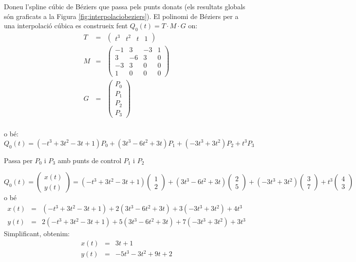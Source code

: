 \begin{llista}
\item Doneu l'spline cúbic de Béziers que passa pels punts donats (els resultats globals són graficats a la Figura \ref{fig:interpolaciobeziers}). El polinomi de Béziers per a una interpolació cúbica es construeix fent $Q_0(t)=T\cdot M \cdot G$ on:
\begin{eqnarray*}
  T&=& \begin{pmatrix}t^3 & t^2 & t & 1\end{pmatrix}\\
  M&=& \begin{pmatrix}
              -1 & 3 & -3 & 1 \\
              3 & -6 & 3 & 0 \\
              -3 & 3 & 0 & 0 \\
              1 & 0 & 0 & 0
        \end{pmatrix}\\
  G&=& \begin{pmatrix}
              P_0 \\
              P_1 \\
              P_2 \\
              P_3
        \end{pmatrix}\\
\end{eqnarray*}

o bé:
\[
  Q_0(t)=(-t^3+3t^2-3t+1)P_0+(3t^3-6t^2+3t)P_1+(-3t^3+3t^2)P_2+t^3P_3
\]

\begin{llista}
  \item Passa per $P_0$ i $P_3$ amb punts de control $P_1$ i $P_2$


  \[
    Q_0(t)=\begin{pmatrix}x(t)\\y(t)\end{pmatrix}=(-t^3+3t^2-3t+1)\begin{pmatrix}1\\2\end{pmatrix}
          +(3t^3-6t^2+3t)\begin{pmatrix}2\\5\end{pmatrix}
          +(-3t^3+3t^2)\begin{pmatrix}3\\7\end{pmatrix}
          +t^3\begin{pmatrix}4\\3\end{pmatrix}
  \]
  o bé
  \begin{eqnarray*}
    x(t)&=&(-t^3+3t^2-3t+1)+2(3t^3-6t^2+3t)+3(-3t^3+3t^2)+4t^3\\
    y(t)&=&2(-t^3+3t^2-3t+1)+5(3t^3-6t^2+3t)+7(-3t^3+3t^2)+3t^3
  \end{eqnarray*}
  Simplificant, obtenim:
  \begin{eqnarray*}
    x(t)&=&3t+1\\
    y(t)&=&-5t^3-3t^2+9t+2
  \end{eqnarray*}



\end{llista}
\end{llista}
